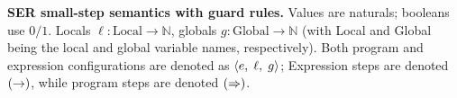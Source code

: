 \noindent\textbf{SER small-step semantics with guard rules.}
%
%
Values are naturals; booleans use $0/1$. Locals $\ell:\mathrm{Local}\to\mathbb{N}$, globals $g:\mathrm{Global}\to\mathbb{N}$ (with Local and Global being the local and global variable names, respectively).
Both program and expression configurations are denoted as $\langle e,\; \ell,\; g\rangle$; 
Expression steps are denoted $(\mathrel{\rightarrow})$, while program steps are denoted $(\mathrel{\Rightarrow})$.
%
%

